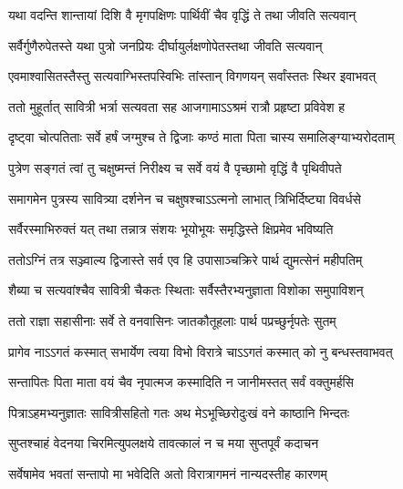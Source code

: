 \begin{center}

\twolineshloka
{यथा वदन्ति शान्तायां दिशि वै मृगपक्षिणः}
{पार्थिवीं चैव वृद्धिं ते तथा जीवति सत्यवान्}


\twolineshloka
{सर्वैर्गुणैरुपेतस्ते यथा पुत्रो जनप्रियः}
{दीर्घायुर्लक्षणोपेतस्तथा जीवति सत्यवान्}


\twolineshloka
{एवमाश्वासितस्तैस्तु सत्यवाग्भिस्तपस्विभिः}
{तांस्तान् विगणयन् सर्वांस्ततः स्थिर इवाभवत्}

\twolineshloka
{ततो मुहूर्तात् सावित्री भर्त्रा सत्यवता सह}
{आजगामाऽऽश्रमं रात्रौ प्रहृष्टा प्रविवेश ह}

\twolineshloka
{दृष्ट्वा चोत्पतिताः सर्वे हर्षं जग्मुश्च ते द्विजाः}
{कण्ठं माता पिता चास्य  समालिङ्ग्याभ्यरोदताम्}


\twolineshloka
{पुत्रेण सङ्गतं त्वां तु चक्षुष्मन्तं निरीक्ष्य च}
{सर्वे वयं वै पृच्छामो वृद्धिं वै पृथिवीपते}

\twolineshloka
{समागमेन पुत्रस्य सावित्र्या दर्शनेन च}
{चक्षुषश्चाऽऽत्मनो लाभात् त्रिभिर्दिष्ट्या विवर्धसे}

\twolineshloka
{सर्वैरस्माभिरुक्तं यत् तथा तन्नात्र संशयः}
{भूयोभूयः समृद्धिस्ते क्षिप्रमेव भविष्यति}


\twolineshloka
{ततोऽग्निं तत्र सञ्ज्वाल्य द्विजास्ते सर्व एव हि}
{उपासाञ्चक्रिरे पार्थ द्युमत्सेनं महीपतिम्}

\twolineshloka
{शैब्या च सत्यवांश्चैव सावित्री चैकतः स्थिताः}
{सर्वैस्तैरभ्यनुज्ञाता विशोका समुपाविशन्}

\twolineshloka
{ततो राज्ञा सहासीनाः सर्वे ते वनवासिनः}
{जातकौतूहलाः पार्थ पप्रच्छुर्नृपतेः सुतम्}

\twolineshloka
{प्रागेव नाऽऽगतं कस्मात् सभार्येण त्वया विभो}
{विरात्रे चाऽऽगतं कस्मात् को नु बन्धस्तवाभवत्}

\twolineshloka
{सन्तापितः पिता माता वयं चैव नृपात्मज}
{कस्मादिति न जानीमस्तत् सर्वं वक्तुमर्हसि}


\twolineshloka
{पित्राऽहमभ्यनुज्ञातः सावित्रीसहितो गतः}
{अथ मेऽभूच्छिरोदुःखं वने काष्ठानि भिन्दतः}

\twolineshloka
{सुप्तश्चाहं वेदनया चिरमित्युपलक्षये}
{तावत्कालं न च मया सुप्तपूर्वं कदाचन}

\twolineshloka
{सर्वेषामेव भवतां सन्तापो मा भवेदिति}
{अतो विरात्रागमनं नान्यदस्तीह कारणम्}


\end{center}
